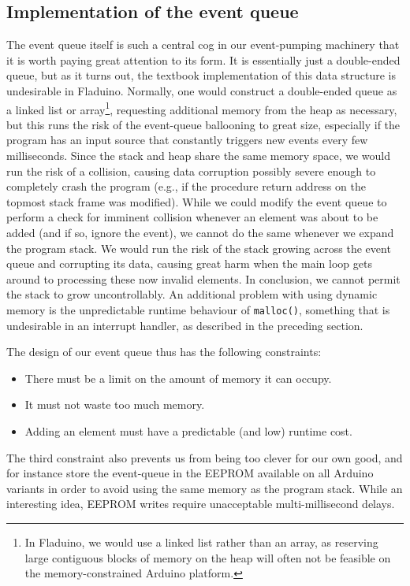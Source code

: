 \documentclass[a4paper, oneside, final]{memoir}
\begin{document}
\subsection{Implementation of the event queue}
\label{sec:event_queue}
The event queue itself is such a central cog in our event-pumping
machinery that it is worth paying great attention to its form.  It is
essentially just a double-ended queue, but as it turns out, the
textbook implementation of this data structure is undesirable in
Fladuino.  Normally, one would construct a double-ended queue as a
linked list or array\footnote{In Fladuino, we would use a linked list
  rather than an array, as reserving large contiguous blocks of memory
  on the heap will often not be feasible on the memory-constrained
  Arduino platform.}, requesting additional memory from the heap as
necessary, but this runs the risk of the event-queue ballooning to
great size, especially if the program has an input source that
constantly triggers new events every few milliseconds.  Since the
stack and heap share the same memory space, we would run the risk of a
collision, causing data corruption possibly severe enough to
completely crash the program (e.g., if the procedure return address on
the topmost stack frame was modified).  While we could modify the
event queue to perform a check for imminent collision whenever an
element was about to be added (and if so, ignore the event), we cannot
do the same whenever we expand the program stack. We would run the
risk of the stack growing across the event queue and corrupting its
data, causing great harm when the main loop gets around to processing
these now invalid elements.  In conclusion, we cannot permit the stack
to grow uncontrollably.  An additional problem with using dynamic
memory is the unpredictable runtime behaviour of \texttt{malloc()},
something that is undesirable in an interrupt handler, as described in
the preceding section.

The design of our event queue thus has the following constraints:

\begin{itemize}
\item There must be a limit on the amount of memory it can occupy.
\item It must not waste too much memory.
\item Adding an element must have a predictable (and low) runtime
  cost.
\end{itemize}

The third constraint also prevents us from being too clever for our
own good, and for instance store the event-queue in the EEPROM
available on all Arduino variants in order to avoid using the same
memory as the program stack.  While an interesting idea, EEPROM writes
require unacceptable multi-millisecond delays.
\end{document}
